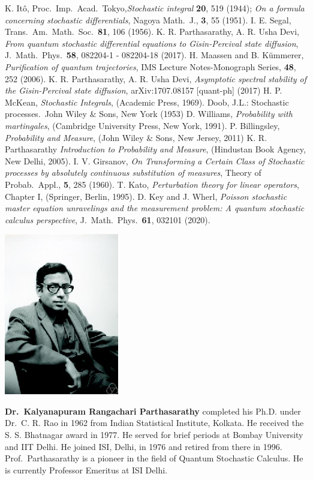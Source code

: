 \begin{thebibliography}{99}
	 K. It\^{o}, Proc.\ Imp.\ Acad.\ Tokyo,{\em Stochastic integral} {\bf 20}, 519 (1944); {\em On a formula concerning stochastic differentials}, Nagoya Math.\ J., {\bf 3}, 55 (1951).
	 I. E. Segal, Trans.\ Am.\ Math.\ Soc.\ {\bf 81}, 106 (1956). 
	 K. R. Parthasarathy, A. R.  Usha Devi, {\em From quantum stochastic differential equations to Gisin-Percival state diffusion}, J.\ Math.\ Phys.\ {\bf 58},  082204-1 - 082204-18   (2017).      
	 H. Maassen and B. K{\"u}mmerer, {\em Purification of quantum trajectories}, IMS Lecture Notes-Monograph Series, {\bf 48}, 252 (2006). 
	 K. R. Parthasarathy, A. R.  Usha Devi, {\em Asymptotic spectral stability of the Gisin-Percival state diffusion},  arXiv:1707.08157 [quant-ph] (2017)
	 H. P. McKean, {\em Stochastic Integrals}, (Academic Press, 1969).
	 Doob, J.L.:  Stochastic processes.\ John Wiley $\&$ Sons, New York (1953)
	  D. Williams,  {\em Probability with martingales},  (Cambridge University Press, New York, 1991). 
	 P. Billingsley, {\em  Probability and Measure}, (John Wiley $\&$ Sons, New Jersey, 2011) 
	 K. R. Parthasarathy {\em  Introduction to Probability and Measure}, (Hindustan Book Agency, New Delhi, 2005).  
	 I. V. Girsanov, {\em On Transforming a Certain Class of Stochastic processes by absolutely continuous substitution of measures}, Theory of Probab.\ Appl., {\bf 5}, 285 (1960). 
	  T. Kato, {\em  Perturbation theory for linear operators}, Chapter I,  (Springer, Berlin, 1995).
	 D. Key and J. Wherl, {\em Poisson stochastic master equation unravelings and the measurement problem: A quantum stochastic calculus perspective}, J.\ Math.\ Phys.\ {\bf 61}, 032101 (2020). 
\end{thebibliography}
\bigskip

\centerline{\includegraphics[scale=1.4]{authorsphotos/Prof_K_R_Parthasarathy.eps}}
\bigskip

\noindent
\textbf{Dr.\ Kalyanapuram Rangachari Parthasarathy} completed his Ph.D. under Dr.\ C. R. Rao in 1962 from Indian Statistical Institute, Kolkata. He received the S. S. Bhatnagar award in 1977. He served for brief periods at Bombay University and IIT Delhi. He joined ISI, Delhi, in 1976 and retired from there in 1996. Prof.\ Parthasarathy is a pioneer in the field of Quantum Stochastic Calculus. He is currently Professor Emeritus at ISI Delhi.
